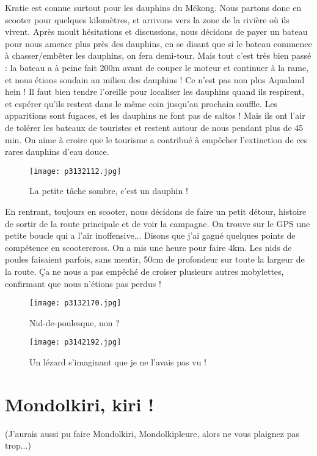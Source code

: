 \documentclass{book}
\begin{document}
Kratie est connue surtout pour les dauphins du Mékong. Nous partons donc en scooter pour quelques kilomètres, et arrivons vers la zone de la rivière où ils vivent. Après moult hésitations et discussions, nous décidons de payer un bateau pour nous amener plus près des dauphins, en se disant que si le bateau commence à chasser/embêter les dauphins, on fera demi-tour. Mais tout c'est très bien passé : la bateau a à peine fait 200m avant de couper le moteur et continuer à la rame, et nous étions soudain au milieu des dauphins ! Ce n'est pas non plus Aqualand hein ! Il faut bien tendre l'oreille pour localiser les dauphins quand ils respirent, et espérer qu'ils restent dans le même coin jusqu'au prochain souffle. Les apparitions sont fugaces, et les dauphins ne font pas de saltos ! Mais ils ont l'air de tolérer les bateaux de touristes et restent autour de nous pendant plus de 45 min. On aime à croire que le tourisme a contribué à empêcher l'extinction de ces rares dauphins d'eau douce.


\begin{figure}[h]
\centering
\texttt{[image: p3132112.jpg]}
\caption*{La petite tâche sombre, c'est un dauphin !}
\end{figure}

En rentrant, toujours en scooter, nous décidons de faire un petit détour, histoire de sortir de la route principale et de voir la campagne. On trouve sur le GPS une petite boucle qui a l'air inoffensive... Disons que j'ai gagné quelques points de compétence en scootercross. On a mis une heure pour faire 4km. Les nids de poules faisaient parfois, sans mentir, 50cm de profondeur sur toute la largeur de la route. Ça ne nous a pas empêché de croiser plusieurs autres mobylettes, confirmant que nous n'étions pas perdus !


\begin{figure}[h]
\centering
\texttt{[image: p3132170.jpg]}
\caption*{Nid-de-poulesque, non ?}
\end{figure}


\begin{figure}[h]
\centering
\texttt{[image: p3142192.jpg]}
\caption*{Un lézard s'imaginant que je ne l'avais pas vu !}
\end{figure}



\chapter{Mondolkiri, kiri !}
(J'aurais aussi pu faire Mondolkiri, Mondolkipleure, alors ne vous plaignez pas trop...)
\end{document}
